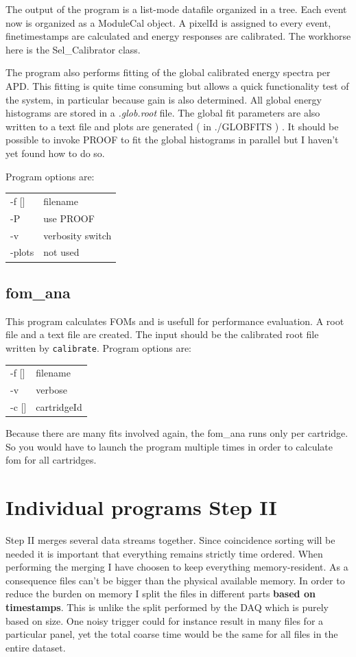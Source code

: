 \documentclass[12pt]{article}
\begin{document}
The output of the program is a list-mode datafile organized in a tree. Each event now is organized as a  ModuleCal object. A pixelId is assigned to every event, finetimestamps are calculated and energy responses are calibrated. The workhorse here is the Sel\_Calibrator class. 

The program also performs fitting of the global calibrated energy spectra per APD. This fitting is quite time consuming but allows a quick functionality test of the system, in particular because gain is also determined. All global energy histograms are stored in a {\em *.glob.root} file. The global fit parameters are also written to a text file and plots are generated ( in ./GLOBFITS ) . It should be possible to invoke PROOF to fit the global histograms in parallel but I haven't yet found how to do so. 

Program options are:\\
\begin{tabular}{ll}
-f []& filename \\
-P & use PROOF\\
-v & verbosity switch\\
-plots & not used\\
\end{tabular}

\subsection{fom\_ana}
This program calculates FOMs and is usefull for performance evaluation. A root file and a text file are created. The input should be the calibrated root file written by {\tt calibrate}. Program options are:
\begin{tabular}{ll}
-f []& filename\\
-v & verbose\\
-c []& cartridgeId\\
\end{tabular}
Because there are many fits involved again, the fom\_ana runs only per cartridge. So you would have to launch the program multiple times in order to calculate fom for all cartridges.

\section{Individual programs Step II}
Step II merges several data streams together. Since coincidence sorting will be needed it is important that everything remains strictly time ordered. When performing the merging I have choosen to keep everything memory-resident. As a consequence files can't be bigger than the physical available memory. In order to reduce the burden on memory I split the files in different parts {\bf based on timestamps}. This is unlike the split performed by the DAQ which is purely based on size. One noisy trigger could for instance result in many files for a particular panel, yet the total coarse time would be the same for all files in the entire dataset. 
\end{document}
